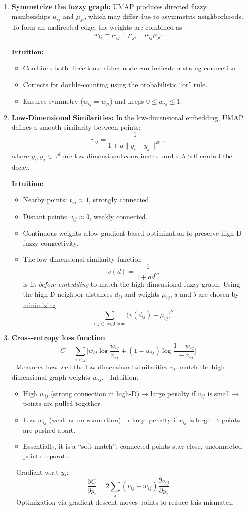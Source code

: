 \documentclass{article}
\begin{document}
\begin{enumerate}
\item \textbf{Symmetrize the fuzzy graph:}  
UMAP produces directed fuzzy memberships $\mu_{ij}$ and $\mu_{ji}$, which may differ due to asymmetric neighborhoods. To form an undirected edge, the weights are combined as
\[
w_{ij} = \mu_{ij} + \mu_{ji} - \mu_{ij}\mu_{ji}.
\]

\textbf{Intuition:}
\begin{itemize}
    \item Combines both directions: either node can indicate a strong connection.
    \item Corrects for double-counting using the probabilistic “or” rule.
    \item Ensures symmetry ($w_{ij} = w_{ji}$) and keeps $0 \le w_{ij} \le 1$.
\end{itemize}


\item \textbf{Low-Dimensional Similarities:}
In the low-dimensional embedding, UMAP defines a smooth similarity between points:
\[
v_{ij} = \frac{1}{1 + a \|y_i - y_j\|^{2b}},
\]
where $y_i, y_j \in \mathbb{R}^d$ are low-dimensional coordinates, and $a,b>0$ control the decay.

\textbf{Intuition:}
\begin{itemize}
    \item Nearby points: $v_{ij} \approx 1$, strongly connected.
    \item Distant points: $v_{ij} \approx 0$, weakly connected.
    \item Continuous weights allow gradient-based optimization to preserve high-D fuzzy connectivity.
	\item The low-dimensional similarity function
\[
v(d) = \frac{1}{1 + a d^{2b}}
\]
is fit \emph{before embedding} to match the high-dimensional fuzzy graph. Using the high-D neighbor distances $d_{ij}$ and weights $\mu_{ij}$, $a$ and $b$ are chosen by minimizing
\[
\sum_{i,j \in \text{neighbors}} \big(v(d_{ij}) - \mu_{ij}\big)^2.
\]
\end{itemize}

\item \textbf{Cross-entropy loss function:}  
\[
C = \sum_{i<j} \Big[ w_{ij} \log \frac{w_{ij}}{v_{ij}} + (1 - w_{ij}) \log \frac{1 - w_{ij}}{1 - v_{ij}} \Big]
\]
- Measures how well the low-dimensional similarities $v_{ij}$ match the high-dimensional graph weights $w_{ij}$.
- Intuition:
\begin{itemize}
    \item High $w_{ij}$ (strong connection in high-D) → large penalty if $v_{ij}$ is small → points are pulled together.
    \item Low $w_{ij}$ (weak or no connection) → large penalty if $v_{ij}$ is large → points are pushed apart.
    \item Essentially, it is a “soft match”: connected points stay close, unconnected points separate.
\end{itemize}
- Gradient w.r.t $y_i$:
\[
\frac{\partial C}{\partial y_i} = 2 \sum_j (v_{ij} - w_{ij}) \frac{\partial v_{ij}}{\partial y_i}
\]
- Optimization via gradient descent moves points to reduce this mismatch.


\end{enumerate}
\end{document}
